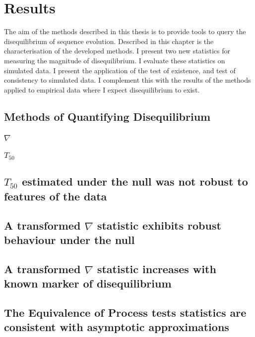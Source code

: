 \chapter{Results}

The aim of the methods described in this thesis is to provide tools to query the disequilibrium of sequence evolution. Described in this chapter is the characterisation of the developed methods. I present two new statistics for measuring the magnitude of disequilibrium. I evaluate these statistics on simulated data. I present the application of the test of existence, and test of consistency to simulated data. I complement this with the results of the methods applied to empirical data where I expect disequilibrium to exist.

\section{Methods of Quantifying Disequilibrium}

\subsection{$\nabla$}


\subsection{$T_{50}$}




\section{$T_{50}$ estimated under the null was not robust to features of the data}

% 

\section{A transformed $\nabla$ statistic exhibits robust behaviour under the null}

% 

\section{A transformed $\nabla$ statistic increases with known marker of disequilibrium}

 
\section{The Equivalence of Process tests statistics are consistent with asymptotic approximations}




